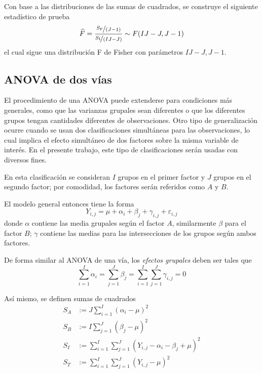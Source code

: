 \documentclass[12pt,letterpaper]{book}
\begin{document}
Con base a las distribuciones de las sumas de cuadrados, se construye el siguiente estadístico de prueba
\begin{equation}
\widehat{F} = \frac{\nicefrac{S_{\text{F}}}{(J - 1)}}{\nicefrac{S_{\text{I}}}{(I J - J)}}
\sim F(I J -J, J-1)
\end{equation}
el cual sigue una distribución F de Fisher con parámetros $I J -J, J-1$.

\subsection{ANOVA de dos vías}
\label{sec:ANOVA2}

El procedimiento de una ANOVA puede extenderse para condiciones más generales, como que las varianzas grupales sean diferentes o que los diferentes grupos tengan cantidades diferentes de observaciones.
%
Otro tipo de generalización ocurre cuando se usan dos clasificaciones simultáneas para las observaciones, lo cual implica el efecto simultáneo de dos factores sobre la misma variable de interés.
%
En el presente trabajo, este tipo de clasificaciones serán usadas con diversos fines.

En esta clasificación se consideran $I$ grupos en el primer factor y $J$ grupos en el segundo factor; por comodidad, los factores serán referidos como $A$ y $B$.
%



El modelo general entonces tiene la forma
\begin{equation}
Y_{i,j} = \mu + \alpha_i + \beta_j + \gamma_{i,j}  + \varepsilon_{i,j}
\end{equation}
donde $\alpha$ contiene las media grupales según el factor $A$, similarmente $\beta$ para el factor $B$; $\gamma$ contiene las medias para las intersecciones de los grupos según ambos factores.

De forma similar al ANOVA de una vía, los \textit{efectos grupales} deben ser tales que 
\begin{equation}
\sum_{i=1}^I \alpha_i = \sum_{j=1}^J \beta_j = \sum_{i=1}^I \sum_{j=1}^J \gamma_{i,j} = 0
\end{equation}

Así mismo, se definen sumas de cuadrados
\begin{align}
S_A &:= J \sum_{i=1}^I \left( \alpha_i - \mu \right)^2 \\
S_B &:= I \sum_{j=1}^J \left( \beta_j  - \mu \right)^2 \\
S_I &:= \sum_{i=1}^I \sum_{j=1}^J \left( Y_{i,j} - \alpha_i - \beta_j + \mu \right)^2 \\
S_T &:= \sum_{i=1}^I \sum_{j=1}^J \left( Y_{i,j}  - \mu \right)^2 
\end{align}
\end{document}
